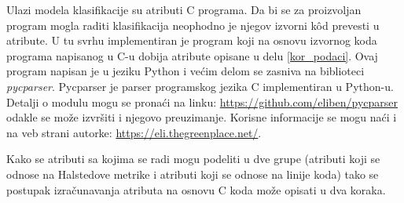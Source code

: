 \documentclass[12pt,oneside]{memoir}
\begin{document}
Ulazi modela klasifikacije su atributi C programa. Da bi se za proizvoljan program mogla raditi klasifikacija neophodno je njegov izvorni k\^od prevesti u atribute. U tu svrhu implementiran je program koji na osnovu izvornog koda programa napisanog u C-u dobija atribute opisane u delu \ref{kor_podaci}. Ovaj program napisan je u jeziku Python i većim delom se zasniva na biblioteci \textit{pycparser}. Pycparser je parser programskog jezika C implementiran u Python-u. Detalji o modulu mogu se pronaći na linku: \url{https://github.com/eliben/pycparser} odakle se može izvršiti i njegovo preuzimanje. Korisne informacije se mogu naći i na veb strani autorke: \url{https://eli.thegreenplace.net/}.

Kako se atributi sa kojima se radi mogu podeliti u dve grupe (atributi koji se odnose na Halstedove metrike i atributi koji se odnose na linije koda) tako se postupak izračunavanja atributa na osnovu C koda može opisati u dva koraka. 
\end{document}
